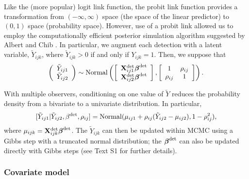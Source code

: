 \documentclass[10pt]{article}
\begin{document}
Like the (more popular) logit link function, the probit link function provides a transformation from $(-\infty,\infty)$ space (the space of the linear predictor) to $(0,1)$ space (probability space).  However, use of a probit link allowed us to employ the computationally efficient posterior simulation algorithm suggested by Albert and Chib \cite{AlbertChib1993}.  In particular, we augment each detection with a latent variable, $\tilde{Y}_{ijk}$, where $\tilde{Y}_{ijk}>0$ if and only if $Y_{ijk}=1$.  Then,
we suppose that
\begin{equation} \label{eq:obs.mod}
\left(\begin{array}{c}
				\tilde{Y}_{ij1} \\
				\tilde{Y}_{ij2}
		\end{array}\right) \sim {\rm Normal}
\left( \left[ \begin{array}{c}
				{\bf X}_{ij1}^{\rm det} \boldsymbol{\beta}^{\rm det}\\
				{\bf X}_{ij2}^{\rm det} \boldsymbol{\beta}^{\rm det}
		\end{array}\right],
        \left[ \begin{array}{cc}
            1 & \rho_{ij} \\
            \rho_{ij} & 1
        \end{array} \right]
\right).
\end{equation}

With multiple observers, conditioning on one value of $\tilde{Y}$ reduces the probability density from a bivariate to a univariate distribution.  In particular,
\begin{equation}
\label{eq:biv_to_univ}
[\tilde{Y}_{ij1} | \tilde{Y}_{ij2},\beta^{\rm det},\rho_{ij}]={\rm Normal}(\mu_{ij1}+\rho_{ij}(\tilde{Y}_{ij2}-\mu_{ij2}),1-\rho_{ij}^2),
\end{equation}
where $\mu_{ijk}={\bf X}_{ijk}^{\rm det} \boldsymbol{\beta}^{\rm det}$.
The $\tilde{Y}_{ijk}$ can then be updated within MCMC using a Gibbs step with a truncated normal
distribution; the $\boldsymbol{\beta}^{\rm det}$ can also be updated directly with Gibbs steps (see Text S1 for further details).

\subsubsection*{Covariate model}
\end{document}
